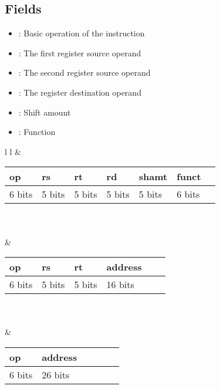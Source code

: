 \documentclass{article}
\begin{document}
\subsection{Fields}
\begin{itemize}
	\item {}: Basic operation of the instruction
	\item {}: The first register source operand
	\item {}: The second register source operand
	\item {}: The register destination operand
	\item {}: Shift amount
	\item {}: Function
\end{itemize}
\newcommand{\cellw}{1.3cm}	
\begin{tabular}{l l}
	 &
	\begin{tabular}{| p{\cellw} | p{\cellw} | p{\cellw} | p{\cellw} | p{\cellw} | p{\cellw} | p{\cellw} |}
		\hline
		op & rs & rt & rd & shamt & funct \\
		\hline 
		6 bits & 5 bits & 5 bits & 5 bits & 5 bits & 6 bits\\
		\hline	
	\end{tabular}\\\\
	 &
	\begin{tabular}{| p{\cellw} | p{\cellw} | p{\cellw} | p{\cellw} p{\cellw} p{\cellw} |}
		\hline
		op & rs & rt & address & & \\
		\hline
		6 bits & 5 bits & 5 bits & 16 bits & & \\
		\hline
	\end{tabular}\\\\
	 &
	\begin{tabular}{| p{\cellw} | p{\cellw} p{\cellw} p{\cellw} p{\cellw} p{\cellw} |}
		\hline
		op & address & & & & \\
		\hline
		6 bits & 26 bits & & & & \\
		\hline
	\end{tabular}
\end{tabular}
\end{document}
